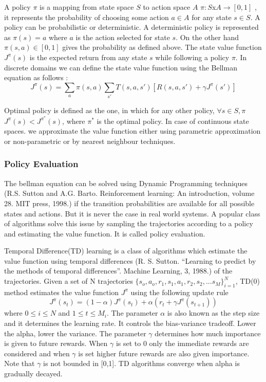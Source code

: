 \documentclass[MTech]{iitmdiss}
\begin{document}
A policy $\pi$ is a mapping from state space $S$ to action space $A$ $\pi:S$x$A \rightarrow [0,1]$ , it represents the probability of choosing some action $a \in A$ for any state $s \in S$. A policy can be probabilistic or deterministic. A deterministic policy is represented as $\pi(s) = a$ where $a$ is the action selected for state $s$. On the other hand $\pi(s,a) \in [0,1]$ gives the probability as defined above. The state value function $J^{\pi}(s)$ is the expected return from any state $s$ while following a policy $\pi$. In discrete domains we can define the state value function using the Bellman equation as follows : 
$$J^{\pi}(s) = \displaystyle \sum_{a}\pi(s,a) \sum_{s'}T(s,a,s')[ R(s,a,s')+ \gamma J^{\pi}(s') ] $$

Optimal policy is defined as the one, in which for any other policy,  $\forall s\in S,  \pi$ $J^{\pi}(s) < J^{\pi^*}(s)$, where $\pi^*$ is the optimal policy. In case of continuous state spaces. we approximate the value function either using parametric approximation or non-parametric or by nearest neighbour techniques. 

\subsubsection{Policy Evaluation}

The bellman equation can be solved using Dynamic Programming techniques (R.S. Sutton and A.G. Barto. Reinforcement learning: An introduction, volume 28. MIT press, 1998.) if the transition probabilities are available for all possible states and actions. But it is never the case in real world systems. A popular class of algorithms solve this issue by sampling the trajectories according to a policy and estimating the value function. It is called policy evaluation. 

Temporal Difference(TD) learning is a class of algorithms which estimate the value function using temporal differences (R. S. Sutton. “Learning to predict by the methods of temporal differences”. Machine Learning, 3, 1988.) of the trajectories. Given a set of N trajectories $\{s_o,a_o,r_1,s_1,a_1,r_2,s_2,... s_M\}_{i=1}^N$, TD(0) method estimates the value function $J^\pi$ using the following update rule 
$$J^{\pi}(s_t) = (1 - \alpha) J^{\pi}(s_t) + \alpha (r_t + \gamma J^{\pi}(s_{t+1})) $$ 
where $0 \leq  i \leq N$ and $1 \leq t \leq M_i$. The parameter $\alpha$ is also known as the step size and it determines the learning rate. It controls the bias-variance tradeoff. Lower the alpha, lower the variance. The parameter $\gamma$ determines how much importance is given to future rewards. When $\gamma $ is set to 0 only the immediate rewards are considered and when $\gamma$ is set higher future rewards are also given importance. Note that $\gamma$ is not bounded in [0,1].  TD algorithms converge when alpha is gradually decayed. 
\end{document}
